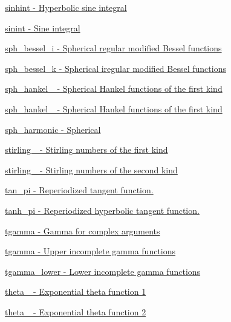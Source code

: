 \begin{DoxyItemize}
\item \hyperlink{group__mathsf__gnu_gab5cbc831c5fab99a967c03d059f1ad59}{sinhint -\/ Hyperbolic sine integral}
\item \hyperlink{group__mathsf__gnu_ga076c8d52588904f5711c41781f8acfa0}{sinint -\/ Sine integral}
\item \hyperlink{group__mathsf__gnu_ga156b8154b27b7898c8b2abf4284f7323}{sph\+\_\+bessel\+\_\+i -\/ Spherical regular modified Bessel functions}
\item \hyperlink{group__mathsf__gnu_ga288b28f2c6995d052a4f5f17293cbf1a}{sph\+\_\+bessel\+\_\+k -\/ Spherical iregular modified Bessel functions}
\item \hyperlink{group__mathsf__gnu_ga4424f565fb224ab88b177beb65d08305}{sph\+\_\+hankel\+\_ -\/ Spherical Hankel functions of the first kind}
\item \hyperlink{group__mathsf__gnu_ga1ca08866a25e3637b04c57ff5a0c36a5}{sph\+\_\+hankel\+\_ -\/ Spherical Hankel functions of the first kind}
\item \hyperlink{group__mathsf__gnu_gacbff28988d5d36f0c3b3fe03d4f57896}{sph\+\_\+harmonic -\/ Spherical}
\item \hyperlink{group__mathsf__gnu_ga2b955dac7d2c5125f2091eaeb25c8ad2}{stirling\+\_ -\/ Stirling numbers of the first kind}
\item \hyperlink{group__mathsf__gnu_ga3761c0e467cbe45cbda66a4e796adcd3}{stirling\+\_ -\/ Stirling numbers of the second kind}
\item \hyperlink{group__mathsf__gnu_ga12855bd62fe6a955ef0d1d5e92c85ba9}{tan\+\_\+pi -\/ Reperiodized tangent function.}
\item \hyperlink{group__mathsf__gnu_ga8729ffd5acf3266315e9dac1b5a9b3a6}{tanh\+\_\+pi -\/ Reperiodized hyperbolic tangent function.}
\item \hyperlink{group__mathsf__gnu_ga73a634663e4eceb1e6bcf3fc16773b7b}{tgamma -\/ Gamma for complex arguments}
\item \hyperlink{group__mathsf__gnu_ga73a634663e4eceb1e6bcf3fc16773b7b}{tgamma -\/ Upper incomplete gamma functions}
\item \hyperlink{group__mathsf__gnu_gaed107908dec8865ea48e7764f7ea88a2}{tgamma\+\_\+lower -\/ Lower incomplete gamma functions}
\item \hyperlink{group__mathsf__gnu_gaa2e5a3a5f550fe032a596a8b01c878c0}{theta\+\_ -\/ Exponential theta function 1}
\item \hyperlink{group__mathsf__gnu_ga16f278edeb2842d614bae1f1ae2d0256}{theta\+\_ -\/ Exponential theta function 2}

\end{DoxyItemize}
